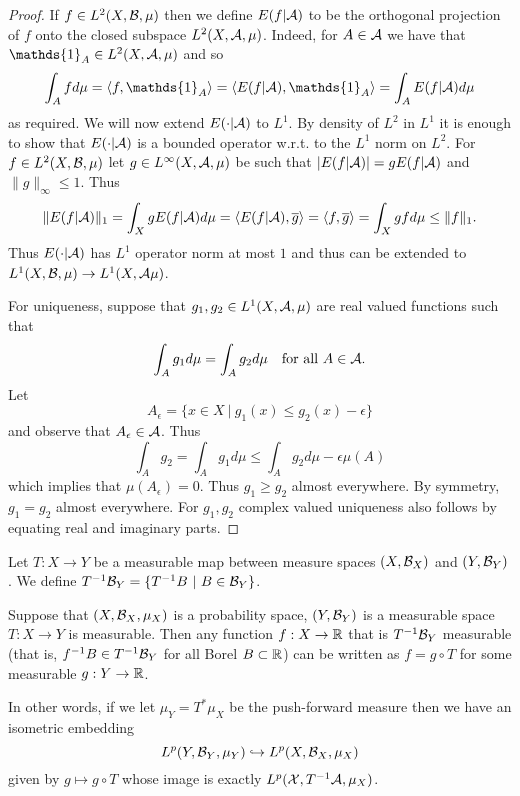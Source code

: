 \documentclass[twoside, a4paper, 10pt]{amsart}
\begin{document}
\begin{proof} If $f \in L^2(X,\mathcal{B},\mu)$ then we define $E(f|\mathcal{A})$ to be the orthogonal projection of $f$ onto the closed subspace $L^2(X,\mathcal{A},\mu)$. Indeed, for $A \in \mathcal{A}$ we have that $\mathds{1}_A \in L^2(X, \cA,\mu)$ and so $$\int_A f d\mu = \langle f, \mathds{1}_A \rangle = \langle E(f|\cA), \mathds{1}_A \rangle = \int_A  E(f|\cA) d\mu$$ as required. We will now extend $E(\cdot |\mathcal{A})$ to $L^1$. By density of $L^2$ in $L^1$ it is enough to show that $E(\cdot |\mathcal{A})$ is a bounded operator w.r.t. to the $L^1$ norm on $L^2$. For $f \in L^2(X,\mathcal{B},\mu)$ let $g \in L^{\infty}(X,\mathcal{A},\mu)$ be such that $|E(f|\mathcal{A})| = gE(f|\mathcal{A})$ and $\|g\|_{\infty} \leq 1$. Thus $$\|E(f|\mathcal{A})\|_{1} = \int_X gE(f|\mathcal{A}) d\mu = \langle E(f|\mathcal{A}), \overline{g} \rangle = \langle f, \overline{g} \rangle = \int_X g f d\mu \leq \|f\|_1.$$ Thus $E(\cdot |\mathcal{A})$ has $L^1$ operator norm at most $1$ and thus can be extended to $L^1(X,\mathcal{B},\mu) \to L^1(X,\mathcal{A}\mu)$.

For uniqueness, suppose that $g_1,g_2 \in L^1(X,\mathcal{A},\mu)$ are real valued functions such that $$\int_A g_1 d\mu = \int_A g_2 d\mu \quad \text{for all } A \in \mathcal{A}.$$ Let $$A_{\epsilon} = \{x \in X ~|~ g_1(x) \leq g_2(x) - \epsilon \}$$ and observe that $A_{\epsilon} \in \mathcal{A}$. Thus $$\int_A g_2 = \int_A g_1 d\mu \leq \int_A g_2 d\mu - \epsilon \mu(A)$$ which implies that $\mu(A_{\epsilon}) = 0$. Thus $g_1 \geq g_2$ almost everywhere. By symmetry, $g_1=g_2$ almost everywhere. For $g_1,g_2$ complex valued uniqueness also follows by equating real and imaginary parts. 
\end{proof}

\begin{mydef} Let $T:X \to Y$ be a measurable map between measure spaces $(X,\mathcal{B}_X)$ and $(Y,\mathcal{B}_Y)$. We define $T^{-1}\mathcal{B}_Y = \{ T^{-1}B ~|~ B \in \mathcal{B}_Y\}$.

\end{mydef}

\begin{prop} Suppose that $(X,\mathcal{B}_X, \mu_X)$ is a probability space, $(Y,\mathcal{B}_Y)$ is a measurable space $T:X \to Y$ is measurable. Then any function $f:X \to \mathbb{R}$ that is $T^{-1}\mathcal{B}_Y$ measurable (that is, $f^{-1}B \in T^{-1}\mathcal{B}_Y$ for all Borel $B \subset \mathbb{R}$) can be written as $f = g \circ T$ for some measurable $g:Y \to \mathbb{R}$. 

In other words, if we let $\mu_Y = T^* \mu_X$ be the push-forward measure then we have an isometric embedding $$L^p(Y, \mathcal{B}_Y, \mu_Y) \hookrightarrow L^p(X,\mathcal{B}_X, \mu_X)$$ given by $g \mapsto g \circ T$ whose image is exactly $L^p(\mathcal{X}, T^{-1}\mathcal{A}, \mu_X)$.
\end{prop}
\end{document}
